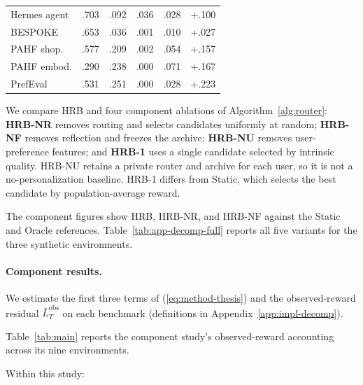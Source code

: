 \documentclass{article} %
\renewcommand{\eqref}[1]{\textup{(\ref{#1})}}
\begin{document}
\begin{table}[t]
\begin{minipage}[t]{0.50\textwidth}
\begin{tabular}{lccccc}
Hermes agent  & .703 & .092 & .036 & .028 & +.100 \\
BESPOKE       & .653 & .036 & .001 & .010 & +.027 \\
PAHF shop.    & .577 & .209 & .002 & .054 & +.157 \\
PAHF embod.   & .290 & .238 & .000 & .071 & +.167 \\
PrefEval      & .531 & .251 & .000 & .028 & +.223 \\
\bottomrule
\end{tabular}
\endgroup
{}
\label{tab:main}\label{tab:e6-decomp}
\end{minipage}
\end{table}

We compare HRB and four component ablations of Algorithm~\ref{alg:router}: \textbf{HRB-NR} removes routing and selects candidates uniformly at random; \textbf{HRB-NF} removes reflection and freezes the archive; \textbf{HRB-NU} removes user-preference features; and \textbf{HRB-1} uses a single candidate selected by intrinsic quality. HRB-NU retains a private router and archive for each user, so it is not a no-personalization baseline. HRB-1 differs from Static, which selects the best candidate by population-average reward.

The component figures show HRB, HRB-NR, and HRB-NF against the Static
and Oracle references. Table~\ref{tab:app-decomp-full} reports all five
variants for the three synthetic environments.

\paragraph{Component results.}

\label{sec:exp-results}

We estimate the first three terms of \eqref{eq:method-thesis} and the observed-reward residual \(\bar L_T^{\mathrm{obs}}\) on each benchmark (definitions in Appendix~\ref{app:impl-decomp}).

Table~\ref{tab:main} reports the component study's observed-reward
accounting across its nine environments.

Within this study:
\end{document}
